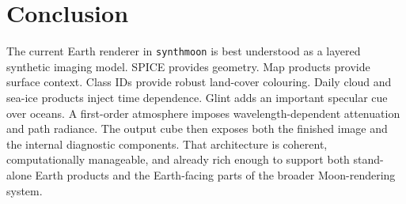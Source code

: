 \documentclass[12pt,a4paper]{article}
\begin{document}
\section{Conclusion}
The current Earth renderer in \texttt{synthmoon} is best understood as a layered synthetic imaging model. SPICE provides geometry. Map products provide surface context. Class IDs provide robust land-cover colouring. Daily cloud and sea-ice products inject time dependence. Glint adds an important specular cue over oceans. A first-order atmosphere imposes wavelength-dependent attenuation and path radiance. The output cube then exposes both the finished image and the internal diagnostic components. That architecture is coherent, computationally manageable, and already rich enough to support both stand-alone Earth products and the Earth-facing parts of the broader Moon-rendering system.

\printbibliography
\end{document}
